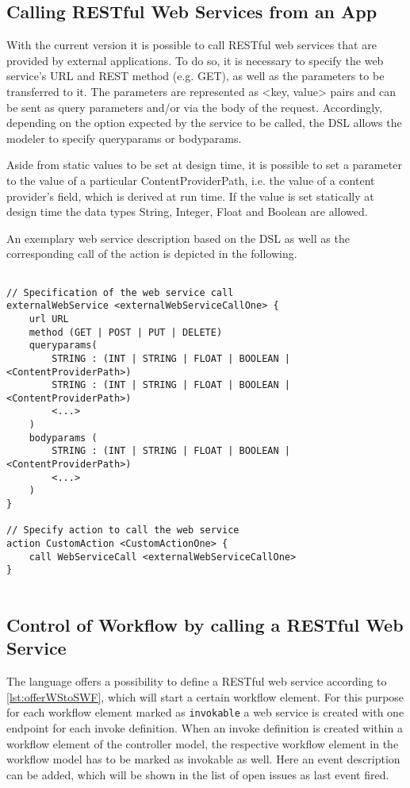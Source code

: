
\subsection{Calling RESTful Web Services from an App}
\label{subsec: CallingWebServices}
With the current \MD version it is possible to call RESTful web services that are provided by external applications. To do so, it is necessary to specify the web service's URL and REST method (e.g. GET), as well as the parameters to be transferred to it. The parameters are represented as <key, value> pairs and can be sent as query parameters and/or via the body of the request. Accordingly, depending on the option expected by the service to be called, the DSL allows the modeler to specify queryparams or bodyparams. 

Aside from static values to be set at design time, it is possible to set a parameter to the value of a particular ContentProviderPath, i.e. the value of a content provider's field, which is derived at run time. If the value is set statically at design time the data types String, Integer, Float and Boolean are allowed. 

An exemplary web service description based on the DSL as well as the corresponding call of the action is depicted in the following.

\begin{lstlisting}[language=MD2, label=lst:callWSfromWF, caption=Calling a Web Service From Within a Workflow]

// Specification of the web service call
externalWebService <externalWebServiceCallOne> {
	url URL
	method (GET | POST | PUT | DELETE)
	queryparams(
		STRING : (INT | STRING | FLOAT | BOOLEAN | <ContentProviderPath>)	
		STRING : (INT | STRING | FLOAT | BOOLEAN | <ContentProviderPath>)
		<...>	
	)
	bodyparams (
		STRING : (INT | STRING | FLOAT | BOOLEAN | <ContentProviderPath>)
		<...>
	)
}

// Specify action to call the web service
action CustomAction <CustomActionOne> {
	call WebServiceCall <externalWebServiceCallOne>
}
	
\end{lstlisting}





\subsection{Control of Workflow by calling a RESTful Web Service}
\label{subsec: WorkflowControlThroughWS}
The \MD language offers a possibility to define a RESTful web service according to \cref{lst:offerWStoSWF}, which will start a certain workflow element. For this purpose for each workflow element marked as \lstinline|invokable| a web service is created with one endpoint for each invoke definition. 
When an invoke definition is created within a workflow element of the controller model, the respective workflow element in the workflow model has to be marked as invokable as well. Here an event description can be added, which will be shown in the list of open issues as last event fired.

